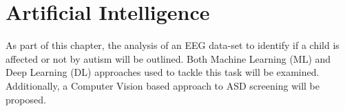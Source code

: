 \chapter{Artificial Intelligence}
\setcounter{secnumdepth}{5}
\label{ch:AI}
\setlength\lineskip{0pt}
\vspace*{15pt}

 
 

As part of this chapter, the analysis of an EEG data-set to identify if a child is affected or not by autism will be outlined. Both Machine Learning (ML) and Deep Learning (DL) approaches used to tackle this task will be examined. Additionally, a Computer Vision based approach to ASD screening will be proposed.




